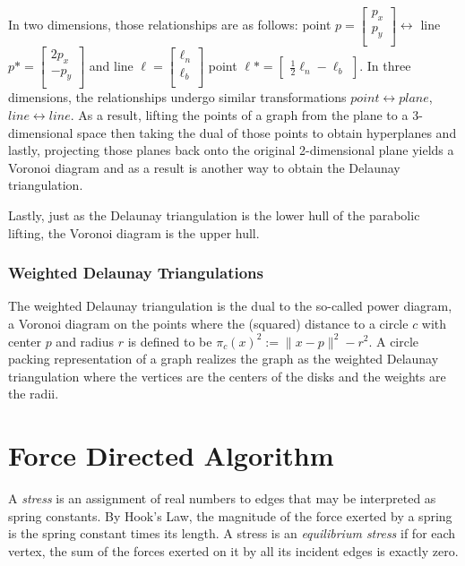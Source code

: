\documentclass[11pt]{article}
\begin{document}
In two dimensions, those relationships are as follows: point $p = 
	\begin{bmatrix}
		p_x \\
		p_y \\
	\end{bmatrix} \leftrightarrow $ line $p* = 
	\begin{bmatrix}
		2p_x \\
		-p_y \\
	\end{bmatrix}$ and line $\ell = 
	\begin{bmatrix}
		\ell_n \\
		\ell_b \\
	\end{bmatrix}$ point $\ell* = 
	\begin{bmatrix}
		\frac{1}{2}\ell_n
		-\ell_b
	\end{bmatrix}$. In three dimensions, the relationships undergo similar transformations $point \leftrightarrow plane$, $line \leftrightarrow line$. As a result, lifting the points of a graph from the plane to a 3-dimensional space then taking the dual of those points to obtain hyperplanes and lastly, projecting those planes back onto the original 2-dimensional plane yields a Voronoi diagram and as a result is another way to obtain the Delaunay triangulation.
	
Lastly, just as the Delaunay triangulation is the lower hull of the parabolic lifting, the Voronoi diagram is the upper hull.

\subsubsection{Weighted Delaunay Triangulations}
The weighted Delaunay triangulation is the dual to the so-called power diagram, a Voronoi diagram on the points where the (squared) distance to a circle $c$ with center $p$ and radius $r$ is defined to be $\pi_c(x)^2 := \|x-p\|^2 - r^2$.
  A circle packing representation of a graph realizes the graph as the weighted Delaunay triangulation where the vertices are the centers of the disks and the weights are the radii. 

\section{Force Directed Algorithm}
A \emph{stress} is an assignment of real numbers to edges that may be interpreted as spring constants. By Hook's Law, the magnitude of the force exerted by a spring is the spring constant times its length. A stress is an \emph{equilibrium stress} if for each vertex, the sum of the forces exerted on it by all its incident edges is exactly zero.
    
\end{document}
